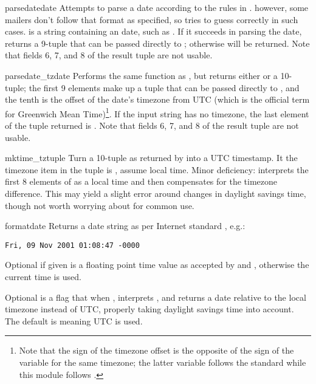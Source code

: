 \begin{funcdesc}{parsedate}{date}
Attempts to parse a date according to the rules in .
however, some mailers don't follow that format as specified, so
 tries to guess correctly in such cases. 
 is a string containing an  date, such as 
.  If it succeeds in parsing
the date,  returns a 9-tuple that can be passed
directly to ; otherwise  will be
returned.  Note that fields 6, 7, and 8 of the result tuple are not
usable.
\end{funcdesc}

\begin{funcdesc}{parsedate_tz}{date}
Performs the same function as , but returns
either  or a 10-tuple; the first 9 elements make up a tuple
that can be passed directly to , and the tenth
is the offset of the date's timezone from UTC (which is the official
term for Greenwich Mean Time)\footnote{Note that the sign of the timezone
offset is the opposite of the sign of the 
variable for the same timezone; the latter variable follows the
\POSIX{} standard while this module follows .}.  If the input
string has no timezone, the last element of the tuple returned is
.  Note that fields 6, 7, and 8 of the result tuple are not
usable.
\end{funcdesc}

\begin{funcdesc}{mktime_tz}{tuple}
Turn a 10-tuple as returned by  into a UTC
timestamp.  It the timezone item in the tuple is , assume
local time.  Minor deficiency:  interprets the
first 8 elements of  as a local time and then compensates
for the timezone difference.  This may yield a slight error around
changes in daylight savings time, though not worth worrying about for
common use.
\end{funcdesc}

\begin{funcdesc}{formatdate}{}
Returns a date string as per Internet standard , e.g.:

\begin{verbatim}
Fri, 09 Nov 2001 01:08:47 -0000
\end{verbatim}

Optional  if given is a floating point time value as
accepted by  and ,
otherwise the current time is used.

Optional  is a flag that when , interprets
, and returns a date relative to the local timezone
instead of UTC, properly taking daylight savings time into account.
The default is  meaning UTC is used.
\end{funcdesc}

